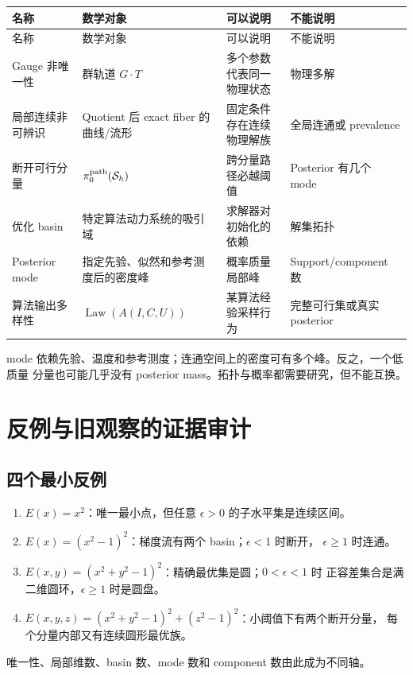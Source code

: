 \documentclass[UTF8,a4paper,11pt]{ctexart}
\newcommand{\Sset}{\mathcal S}
\newcommand{\Law}{\operatorname{Law}}
\begin{document}
\begin{longtable}{>{\raggedright\arraybackslash}p{}
>{\raggedright\arraybackslash}p{}
>{\raggedright\arraybackslash}p{}
>{\raggedright\arraybackslash}p{}}
\toprule
名称 & 数学对象 & 可以说明 & 不能说明\\
\midrule
\endfirsthead
\toprule
名称 & 数学对象 & 可以说明 & 不能说明\\
\midrule
\endhead
Gauge 非唯一性 & 群轨道 $G\cdot T$ & 多个参数代表同一物理状态 & 物理多解\\
局部连续非可辨识 & Quotient 后 exact fiber 的曲线/流形 & 固定条件存在连续物理解族 & 全局连通或 prevalence\\
断开可行分量 & $\pi_0^{\rm path}(\Sset_h)$ & 跨分量路径必越阈值 & Posterior 有几个 mode\\
优化 basin & 特定算法动力系统的吸引域 & 求解器对初始化的依赖 & 解集拓扑\\
Posterior mode & 指定先验、似然和参考测度后的密度峰 & 概率质量局部峰 & Support/component 数\\
算法输出多样性 & $\Law(A(I,C,U))$ & 某算法经验采样行为 & 完整可行集或真实 posterior\\
\bottomrule
\end{longtable}

mode 依赖先验、温度和参考测度；连通空间上的密度可有多个峰。反之，一个低质量
分量也可能几乎没有 posterior mass。拓扑与概率都需要研究，但不能互换。

\section{反例与旧观察的证据审计}

\subsection{四个最小反例}

\begin{enumerate}
  \item $E(x)=x^2$：唯一最小点，但任意 $\epsilon>0$ 的子水平集是连续区间。
  \item $E(x)=(x^2-1)^2$：梯度流有两个 basin；$\epsilon<1$ 时断开，
        $\epsilon\ge1$ 时连通。
  \item $E(x,y)=(x^2+y^2-1)^2$：精确最优集是圆；$0<\epsilon<1$ 时
        正容差集合是满二维圆环，$\epsilon\ge1$ 时是圆盘。
  \item $E(x,y,z)=(x^2+y^2-1)^2+(z^2-1)^2$：小阈值下有两个断开分量，
        每个分量内部又有连续圆形最优族。
\end{enumerate}
唯一性、局部维数、basin 数、mode 数和 component 数由此成为不同轴。
\end{document}
